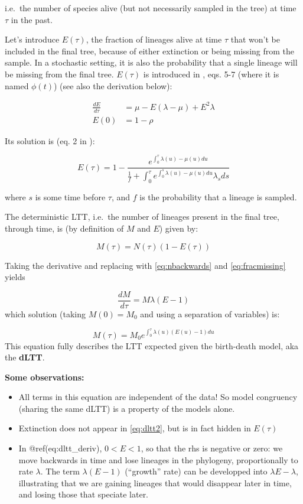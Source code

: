 \documentclass[
]{book}
\providecommand{\tightlist}{%
  \setlength{\itemsep}{0pt}\setlength{\parskip}{0pt}}
\theoremstyle{definition}
\theoremstyle{definition}
\theoremstyle{definition}
\theoremstyle{definition}
\theoremstyle{remark}
\begin{document}
i.e.~the number of species alive (but not necessarily sampled in the tree) at time \(\tau\) in the past.

Let's introduce \(E(\tau)\), the fraction of lineages alive at time \(\tau\) that won't be included in the final tree, because of either extinction or being missing from the sample. In a stochastic setting, it is also the probability that a single lineage will be missing from the final tree. \(E(\tau)\) is introduced in \citet{morlon_reconciling_2011}, eqs. 5-7 (where it is named \(\phi(t)\)) (see also the derivation below):

\begin{align}
\frac{dE}{d\tau} &= \mu - E(\lambda - \mu) + E^2\lambda \\
E(0) &= 1 - \rho 
\label{eq:fracmissing}
\end{align}

Its solution is (eq. 2 in \citet{morlon_reconciling_2011}):

\[
E(\tau) = 1 - \frac{e^{\int_0^\tau \lambda(u) - \mu(u) du}}{\frac{1}{f} + \int_0^\tau e^{\int_0^s \lambda(u) - \mu(u) du} \lambda_s ds} 
\label{eq:fracmissingsol}
\]

where \(s\) is some time before \(\tau\), and \(f\) is the probability that a lineage is sampled.

The deterministic LTT, i.e.~the number of lineages present in the final tree, through time, is (by definition of \(M\) and \(E\)) given by:

\[
M(\tau) = N(\tau)(1 - E(\tau)) 
\label{eq:dltt}
\]

Taking the derivative and replacing with \eqref{eq:nbackwards} and \eqref{eq:fracmissing} yields

\[
  \frac{dM}{d\tau} = M\lambda(E-1)
  \label{eq:dlttderiv}
\]
which solution (taking \(M(0) = M_0\) and using a separation of variables) is:

\[
  M(\tau) = M_0e^{\int_0^\tau \lambda(u) (E(u) - 1) du}
  \label{eq:dltt2}
\]
This equation fully describes the LTT expected given the birth-death model, aka the \textbf{dLTT}.

\textbf{Some observations:}

\begin{itemize}
\tightlist
\item
  All terms in this equation are independent of the data! So model congruency (sharing the same dLTT) is a property of the models alone.
\item
  Extinction does not appear in \eqref{eq:dltt2}, but is in fact hidden in \(E(\tau)\)
\item
  In @ref(eq:dltt\_deriv), \(0<E<1\), so that the rhs is negative or zero: we move backwards in time and lose lineages in the phylogeny, proportionally to rate \(\lambda\). The term \(\lambda(E-1)\) (``growth'' rate) can be developped into \(\lambda E - \lambda\), illustrating that we are gaining lineages that would disappear later in time, and losing those that speciate later.
\end{itemize}
\end{document}
